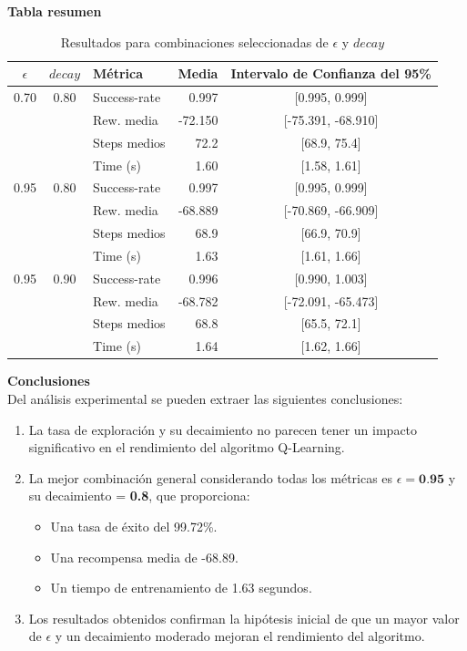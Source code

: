 \newpage
\textbf{Tabla resumen}

\begin{table}[H]
    \centering
    \begin{tabular}{|c|c|l|r|c|}
    \hline
    $\epsilon$ & $decay$ & Métrica        & Media    & Intervalo de Confianza del 95\% \\
    \hline
    0.70 & 0.80 & Success-rate  & 0.997   & [0.995, 0.999] \\
         &      & Rew. media    & -72.150 & [-75.391, -68.910] \\
         &      & Steps medios  & 72.2    & [68.9, 75.4] \\
         &      & Time (s)      & 1.60    & [1.58, 1.61] \\
    \hline
    0.95 & 0.80 & Success-rate  & 0.997   & [0.995, 0.999] \\
         &      & Rew. media    & -68.889 & [-70.869, -66.909] \\
         &      & Steps medios  & 68.9    & [66.9, 70.9] \\
         &      & Time (s)      & 1.63    & [1.61, 1.66] \\
    \hline
    0.95 & 0.90 & Success-rate  & 0.996   & [0.990, 1.003] \\
         &      & Rew. media    & -68.782 & [-72.091, -65.473] \\
         &      & Steps medios  & 68.8    & [65.5, 72.1] \\
         &      & Time (s)      & 1.64    & [1.62, 1.66] \\
    \hline
    \end{tabular}
    \caption{Resultados para combinaciones seleccionadas de $\epsilon$ y $decay$}
    \label{tab:resultados_seleccionados}
\end{table}
    
    

\textbf{Conclusiones}
\\

Del análisis experimental se pueden extraer las siguientes conclusiones:

\begin{enumerate}
    \item La tasa de exploración y su decaimiento no parecen tener un impacto significativo en el rendimiento del algoritmo Q-Learning.
    \item La mejor combinación general considerando todas los métricas es $\epsilon = \textbf{0.95}$ y su decaimiento = \textbf{0.8}, que proporciona:
    \begin{itemize}
        \item Una tasa de éxito del 99.72\%.
        \item Una recompensa media de -68.89.
        \item Un tiempo de entrenamiento de 1.63 segundos.
    \end{itemize}
    \item Los resultados obtenidos confirman la hipótesis inicial de que un mayor valor de \(\epsilon\) y un decaimiento moderado mejoran el rendimiento del algoritmo. 
\end{enumerate}

